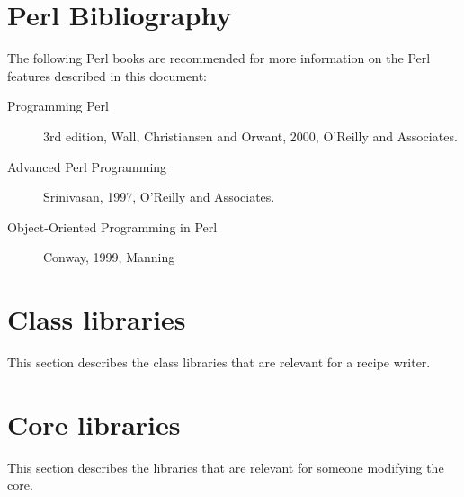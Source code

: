 \documentclass[twoside,11pt]{article}
\renewcommand{\_}{\texttt{\symbol{95}}}
\begin{document}
\section{Perl Bibliography}

The following Perl books are recommended for more information on the
Perl features described in this document:

\begin{description}

\item[Programming Perl] 3rd edition, Wall, Christiansen and Orwant,
  2000, O'Reilly and Associates.

\item[Advanced Perl Programming] Srinivasan, 1997, O'Reilly and Associates.

\item[Object-Oriented Programming in Perl] Conway, 1999, Manning

\end{description}






\section{Class libraries}

This section describes the class libraries that are relevant for
a recipe writer.



\section{Core libraries}

This section describes the libraries that are  relevant for someone
modifying the core.




\end{document}
